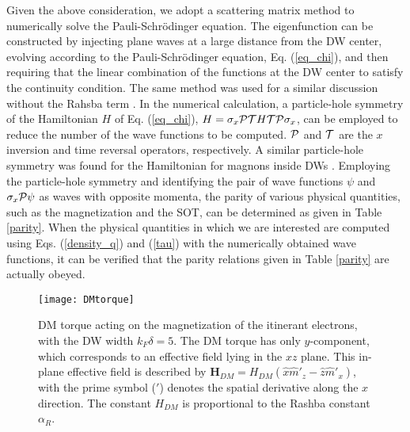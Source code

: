 \documentclass[12pt]{iopart}
\begin{document}
Given the above consideration, we adopt a scattering matrix method to numerically solve the Pauli-Schr\"{o}dinger equation. The eigenfunction can be constructed by injecting plane waves at a large distance from the DW center, evolving according to the Pauli-Schr\"{o}dinger equation, Eq. (\ref{eq_chi}), and then requiring that the linear combination of the functions at the DW center to satisfy the continuity condition. The same method was used for a similar discussion without the Rahsba term \cite{Xiao06}. In the numerical calculation, a particle-hole symmetry of the Hamiltonian $H$ of Eq. (\ref{eq_chi}), $H = \sigma_x {\cal{PT}} H {\cal{TP}} \sigma_x$, can be employed to reduce the number of the wave functions to be computed. $\cal P$ and $\cal T$ are the $x$ inversion and time reversal operators, respectively. A similar particle-hole symmetry was found for the Hamiltonian for magnons inside DWs \cite{Wang17}. Employing the particle-hole symmetry and identifying the pair of wave functions $\psi$ and $\sigma_x {\cal P} \psi$ as waves with opposite momenta, the parity of various physical quantities, such as the magnetization and the SOT, can be determined as given in Table \ref{parity}. When the physical quantities in which we are interested are computed using Eqs. (\ref{density_q}) and (\ref{tau}) with the numerically obtained wave functions, it can be verified that the parity relations given in Table \ref{parity} are actually obeyed.
\begin{figure}\centering
\begin{minipage}[c]{0.5\linewidth}
\texttt{[image: DMtorque]}
\end{minipage}
\caption{DM torque acting on the magnetization of the itinerant electrons, with the DW width $k_F\delta = 5$. The DM torque has only $y$-component, which corresponds to an effective field lying in the $xz$ plane. This in-plane effective field is described by $\textbf{H}_ {DM} = H_ {DM} (\hat{x} \hat {m}'_z - \hat{z} \hat {m}'_x)$, with the prime symbol ($'$) denotes the spatial derivative along the $x$ direction. The constant $H_ {DM}$ is proportional to the Rashba constant $\alpha_R$.}
\label{dmt}
\end{figure}
\end{document}
